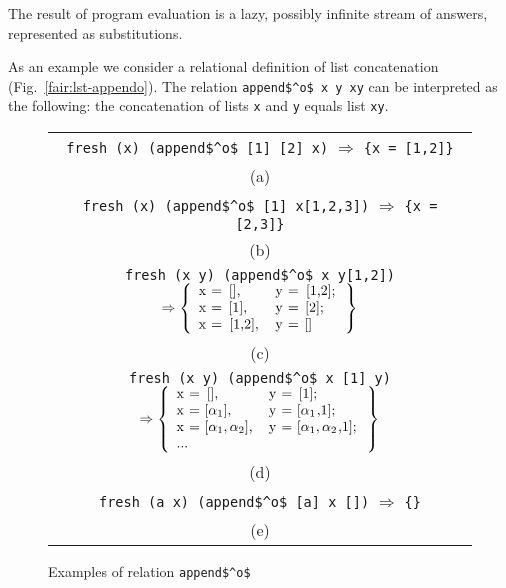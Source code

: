 The result of \mk program evaluation is a lazy, possibly infinite stream of answers, represented as substitutions.

As an example we consider a relational definition of list concatenation (Fig.~\ref{fair:lst-appendo}). The relation \lstinline|append$^o$ x y xy| can be interpreted as the following:
the concatenation of lists \lstinline|x| and \lstinline|y| equals list \lstinline|xy|.

\begin{figure}[h!]
\centering
\begin{tabular}{c}
\lstinline|fresh (x) (append$^o$ [1] [2] x)| $\Rightarrow$ \lstinline|{x = [1,2]}| \\
(a) \\[5mm]
\lstinline|fresh (x) (append$^o$ [1] x[1,2,3])| \!$\Rightarrow$ \lstinline|{x = [2,3]}|\\
(b) \\[5mm]
\lstinline|fresh (x y) (append$^o$ x y[1,2])| $\Rightarrow \left\{
\begin{array}{ll}
\mbox{\lstinline{x = [],}}    & \mbox{\lstinline{y = [1,2];}} \\
\mbox{\lstinline{x = [1],}}   & \mbox{\lstinline{y = [2];}} \\
\mbox{\lstinline{x = [1,2],}} & \mbox{\lstinline{y = []}} \\
\end{array} \right\}$ \\
(c) \\[5mm]
\lstinline|fresh (x y) (append$^o$ x [1] y)| $\Rightarrow \left\{
\begin{array}{ll}
\mbox{\lstinline{x = [],}}    & \mbox{\lstinline{y = [1];}} \\
\mbox{\lstinline{x = [}} \alpha_1\! \mbox{\lstinline{],}} & \mbox{\lstinline{y = [}} \alpha_1\! \mbox{\lstinline{,1];}} \\
\mbox{\lstinline{x = [}} \alpha_1, \alpha_2\! \mbox{\lstinline{],}} & \mbox{\lstinline{y = [}} \alpha_1, \alpha_2\! \mbox{\lstinline{,1];}} \\
...
\end{array} \right\}$ \\
(d)\\[5mm]
\lstinline|fresh (a x) (append$^o$ [a] x [])| $\Rightarrow$ \lstinline|{}|\\
(e) 
\end{tabular}
\caption{Examples of relation \lstinline|append$^o$|}
\label{fair:appendo-examples}
\end{figure}


